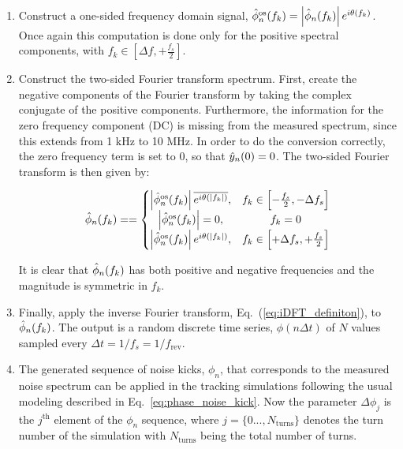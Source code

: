 \begin{enumerate}
    \item Construct a one-sided frequency domain signal, $\hat{\phi}_n^\mathrm{os}(f_k) =\left| \hat{\phi}_n(f_k) \right| e^{{i} \theta(f_k)}$.  Once again this computation is done only for the positive spectral components, with $f_k \in \left[\Delta f,+\frac{f_s}{2} \right ]$.
    \item Construct the two-sided Fourier transform spectrum. First, create the negative components of the Fourier transform by taking the complex conjugate of the positive components. Furthermore, the information for the zero frequency component (DC) is missing from the measured spectrum, since this extends from  1 kHz to 10 MHz. In order to do the conversion correctly, the zero frequency term is set to 0, so that $\hat{y}_n(0)=0$. The two-sided Fourier transform is then given by:
    

    \begin{equation}
        \hat{\phi}_n(f_k) = = \left\{\begin{matrix}
   \left | \hat{\phi}_n^\mathrm{os}(f_k) \right | \overline{e^{{i}\theta (\mid f_k \mid)}}, & f_k \in \left [-\frac{f_s}{2}, -\Delta f_s \right] \\ 
    \left | \hat{\phi}_n^\mathrm{os}(f_k) \right | = 0, & f_k=0  \\
   \left | \hat{\phi}_n^\mathrm{os}(f_k) \right | e^{{i}\theta (\mid f_k \mid)}, & f_k \in \left [+ \Delta f_s, + \frac{f_s}{2} \right]  
    \end{matrix}\right.
    \end{equation}

    It is clear that $\hat{\phi}_n(f_k)$ has both positive and negative frequencies and the magnitude is symmetric in $f_k$.
    
    \item Finally, apply the inverse Fourier transform, Eq.~(\ref{eq:iDFT_definiton}), to $\hat{\phi}_n(f_k)$. The  output is a  random  discrete  time  series, $\phi(n\Delta t)$ of $N$ values sampled every $\Delta t = 1/f_s=1/f_\mathrm{rev}$. 
    
    \item The generated sequence of noise kicks, $\phi_n$, that corresponds to the measured noise spectrum can be applied in the tracking simulations following the usual modeling described in Eq.~\eqref{eq:phase_noise_kick}. Now the parameter $\Delta \phi_j$ is the $j^\mathrm{th}$ element of the $\phi_n$ sequence, where $j=\{0...,N_\mathrm{turns}\}$ denotes the turn number of the simulation with $N_\mathrm{turns}$ being the total number of turns.
    

\end{enumerate} 

